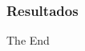 \documentclass{beamer}
\begin{document}

\begin{frame}
\frametitle{Resultados}

\begin{figure}[h]
\centering
{}
\end{figure}

\end{frame}


\begin{frame}
\Huge{\centerline{The End}}
\end{frame}

\end{document}
